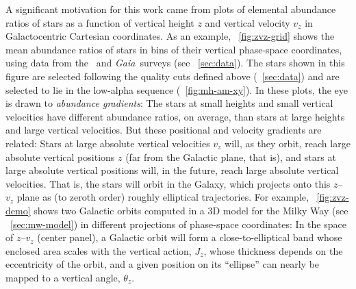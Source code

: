 \documentclass[modern]{aastex63}
\newcommand{\gaia}{\textsl{Gaia}}
\newcommand{\apogee}{\acronym{APOGEE}}
\begin{document}
A significant motivation for this work came from plots of elemental abundance
ratios of stars as a function of vertical height $z$ and vertical velocity $v_z$
in Galactocentric Cartesian coordinates.
As an example, \figurename~\ref{fig:zvz-grid} shows the mean abundance ratios of
stars in bins of their vertical phase-space coordinates, using data from the
\apogee\ and \gaia\ surveys (see \sectionname~\ref{sec:data}).
The stars shown in this figure are selected following the quality cuts defined
above (\sectionname~\ref{sec:data}) and are selected to lie in the low-alpha
sequence (\figurename~\ref{fig:mh-am-xy}).
In these plots, the eye is drawn to \emph{abundance gradients}:
The stars at small heights and small vertical velocities have different
abundance ratios, on average, than stars at large heights and large vertical
velocities.
But these positional and velocity gradients are related:
Stars at large absolute vertical velocities $v_z$ will, as they orbit, reach
large absolute vertical positions $z$ (far from the Galactic plane, that is),
and stars at large absolute vertical positions will, in the future, reach large
absolute vertical velocities.
That is, the stars will orbit in the Galaxy, which projects onto this $z$--$v_z$
plane as (to zeroth order) roughly elliptical trajectories.
For example, \figurename~\ref{fig:zvz-demo} shows two Galactic orbits computed
in a 3D model for the Milky Way (see \sectionname~\ref{sec:mw-model}) in
different projections of phase-space coordinates:
In the space of $z$--$v_z$ (center panel), a Galactic orbit will form a
close-to-elliptical band whose enclosed area scales with the vertical action,
$J_z$, whose thickness depends on the eccentricity of the orbit, and a given
position on its ``ellipse'' can nearly be mapped to a vertical angle,
$\theta_z$.
\end{document}
